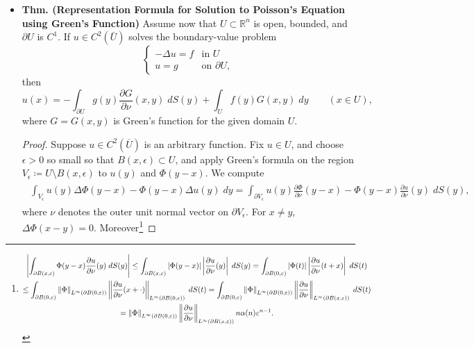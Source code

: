 \documentclass{article}
\begin{document}
\begin{itemize}
		\newpage 
		\item \textbf{Thm. (Representation Formula for Solution to Poisson's Equation using Green's Function)} Assume now that $U \subset \mathbb{R}^{n}$ is open, bounded, and $\partial U$ is $C^{1}$. If $u\in C^{2}(\bar{U})$ solves the boundary-value problem 
		\begin{equation*}
			\begin{cases}
				-\Delta u = f & \text{in $U$} \\
				u = g & \text{on $\partial U$}, 
			\end{cases}
		\end{equation*}
		then 
		\begin{equation*}
			u(x) =-\int_{\partial U}g(y)\frac{\partial G}{\partial \nu}(x, y)\;dS(y) + \int_{U}f(y)G(x,y)\;dy \qquad (x \in U), 
		\end{equation*}
		where $G = G(x,y)$ is Green's function for the given domain $U$.  
		
		\begin{proof}
			Suppose $u \in C^{2}(\overline{U})$ is an arbitrary function. Fix $u \in U$, and choose $\epsilon > 0$ so small so that $B(x, \epsilon) \subset U$, and apply Green's formula on the region $V_{\epsilon}\coloneqq U \setminus B(x, \epsilon)$ to $u(y)$ and $\Phi(y -x)$. We compute 
			\begin{align*}
				\begin{split}
					\int_{V_{\epsilon}}u(y) \Delta \Phi(y - x) - \Phi(y - x)\Delta u(y)\;dy = \int_{\partial V_{\epsilon}}u(y)\frac{\partial \Phi}{\partial\nu}(y - x) - \Phi(y -x)\frac{\partial u}{\partial \nu}(y)\;dS(y), 
				\end{split}
			\end{align*}
			where $\nu$ denotes the outer unit normal vector on $\partial V_{\epsilon}$. For $x \neq y$, $\Delta \Phi(x - y) = 0$. Moreover\footnote{
				\begin{multline*}
					\left| \int_{\partial B(x, \varepsilon)}\Phi(y -x)\frac{\partial u}{\partial \nu}(y)\;dS(y) \right| \leq \int_{\partial B(x, \varepsilon)}\left| \Phi(y - x) \right|\left| \frac{\partial u}{\partial \nu}(y) \right|\;dS(y) = \int_{\partial B(0,\varepsilon)}|\Phi(t)|\left| \frac{\partial u}{\partial \nu}(t + x) \right|\;dS(t) \\
					\leq \int_{\partial B(0, \varepsilon)}\left\Vert \Phi \right\Vert_{L^{\infty}(\partial B(0, \varepsilon))}\left\Vert \frac{\partial u}{\partial \nu}(x + \cdot) \right\Vert_{L^{\infty}(\partial B(0,\varepsilon))}\;dS(t) = \int_{\partial B(0,\varepsilon)}\left\Vert \Phi \right\Vert_{L^{\infty}(\partial B(0,\varepsilon))}\left\Vert \frac{\partial u}{\partial \nu} \right\Vert_{L^{\infty}(\partial B(x,\varepsilon))}\;dS(t) \\
					= \left\Vert \Phi \right\Vert_{L^{\infty}(\partial B(0,\varepsilon))}\left\Vert \frac{\partial u}{\partial \nu} \right\Vert_{L^{\infty}(\partial B(x, \varepsilon))}n\alpha(n)\varepsilon^{n - 1}. 
				\end{multline*}
				
}
\end{proof}
\end{itemize}
\end{document}
